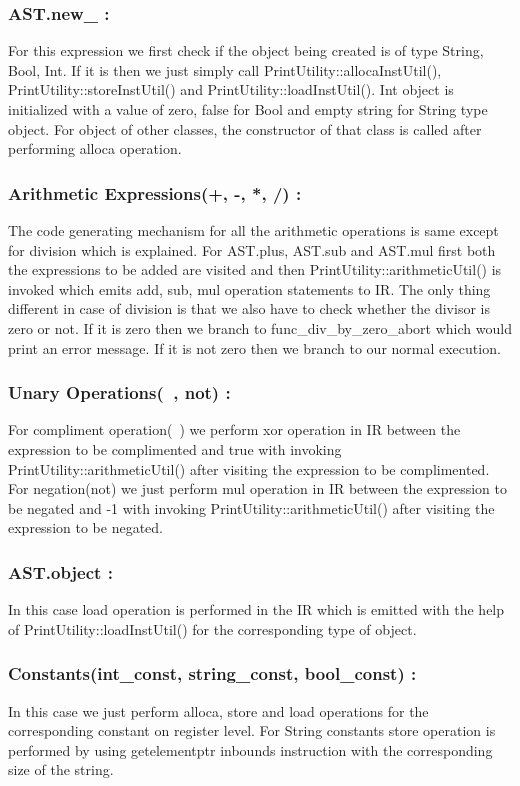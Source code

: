 \documentclass{article}
\begin{document}
\subsubsection{AST.new_ :}
For this expression we first check if the object being created is of type String, Bool, Int. If it is then we just simply call PrintUtility::allocaInstUtil(), PrintUtility::storeInstUtil() and PrintUtility::loadInstUtil(). Int object is initialized with a value of zero, false for Bool and empty string for String type object. For object of other classes, the constructor of that class is called after performing alloca operation.

\subsubsection{Arithmetic Expressions(+, -, *, /) :}
The code generating mechanism for all the arithmetic operations is same except for division which is explained. For AST.plus, AST.sub and AST.mul first both the expressions to be added are visited and then PrintUtility::arithmeticUtil() is invoked which emits add, sub, mul operation statements to IR. The only thing different in case of division is that we also have to check whether the divisor is zero or not. If it is zero then we branch to func\_div\_by\_zero\_abort which would print an error message. If it is not zero then we branch to our normal execution.

\subsubsection{Unary Operations(~, not) :}
For compliment operation(~) we perform xor operation in IR between the expression to be complimented and true with invoking PrintUtility::arithmeticUtil() after visiting the expression to be complimented. For negation(not) we just perform mul operation in IR between the expression to be negated and -1 with invoking PrintUtility::arithmeticUtil() after visiting the expression to be negated.

\subsubsection{AST.object :}
In this case load operation is performed in the IR which is emitted with the help of PrintUtility::loadInstUtil() for the corresponding type of object.

\subsubsection{Constants(int\_const, string\_const, bool\_const) :}
In this case we just perform alloca, store and load operations for the corresponding constant on register level. For String constants store operation is performed by using getelementptr inbounds instruction with the corresponding size of the string.
\end{document}

